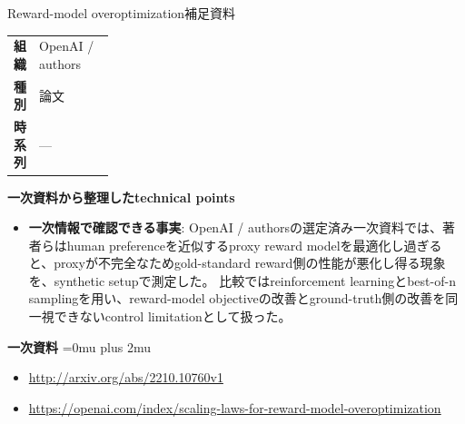 \begin{technicalnote}{Reward-model overoptimization}{補足資料}
\begingroup
\begin{tabularx}{\linewidth}{@{}>{\bfseries}p{0.22\linewidth}X@{}}
組織 & OpenAI / authors \\
種別 & 論文 \\
時系列 & — \\
\end{tabularx}
\smallskip
{\bfseries 一次資料から整理したtechnical points}
\begin{itemize}[leftmargin=1.5em,itemsep=0.35em]
\item \textbf{一次情報で確認できる事実}: OpenAI / authorsの選定済み一次資料では、著者らはhuman preferenceを近似するproxy reward modelを最適化し過ぎると、proxyが不完全なためgold-standard reward側の性能が悪化し得る現象を、synthetic setupで測定した。 比較ではreinforcement learningとbest-of-n samplingを用い、reward-model objectiveの改善とground-truth側の改善を同一視できないcontrol limitationとして扱った。
\end{itemize}
\begin{minipage}{\linewidth}
\begin{samepage}
{\bfseries 一次資料}
\begingroup\sloppy
\Urlmuskip=0mu plus 2mu\relax
\begin{itemize}[leftmargin=1.5em,itemsep=0.25em]
\item {\scriptsize\url{http://arxiv.org/abs/2210.10760v1}}
\item {\scriptsize\url{https://openai.com/index/scaling-laws-for-reward-model-overoptimization}}
\end{itemize}
\endgroup
\end{samepage}
\end{minipage}
\endgroup
\end{technicalnote}
\medskip
